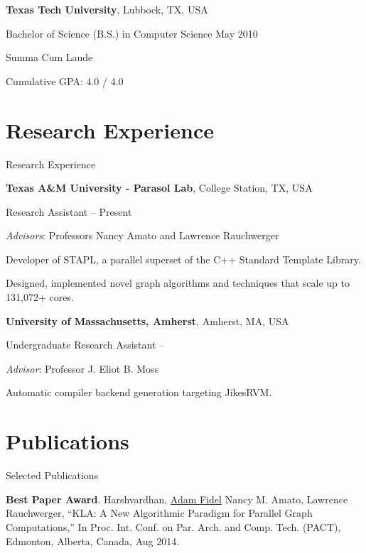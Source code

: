 \documentclass[a4paper,10pt,oneside]{article}
\begin{document}
\begin{body}
\EntryGap
\textbf{Texas Tech University},
Lubbock, TX, USA
\par
Bachelor of Science (B.S.) in Computer Science
\hfill
May 2010
\begin{detail}
Summa Cum Laude
\par
Cumulative GPA: 4.0 / 4.0
\end{detail}




\section{Research Experience}
{Research Experience}

\textbf{Texas A\&M University - Parasol Lab}, College Station, TX, USA
\par
Research Assistant
\hfill
{} --
Present
\begin{detail}
\par
\emph{Advisors}: Professors Nancy Amato and Lawrence Rauchwerger
\par
Developer of STAPL, a parallel superset of the C++ Standard Template Library.
\par
Designed, implemented novel graph algorithms and techniques that scale up to 131,072+ cores.
\end{detail}
\EntryGap

\textbf{University of Massachusetts, Amherst}, Amherst, MA, USA
\par
Undergraduate Research Assistant
\hfill
{} --
\begin{detail}
\emph{Advisor}: Professor J. Eliot B. Moss
\par
Automatic compiler backend generation targeting JikesRVM.
\par
\end{detail}



\section{Publications}
{Selected Publications}

\begin{detail}
{{\bf Best Paper Award}. Harshvardhan, \underline{Adam Fidel} Nancy M. Amato, Lawrence Rauchwerger, ``KLA: A New Algorithmic Paradigm for Parallel Graph Computations,'' In Proc. Int. Conf. on Par. Arch. and Comp. Tech. (PACT), Edmonton, Alberta, Canada, Aug 2014.}
\end{detail}


\end{body}
\end{document}
